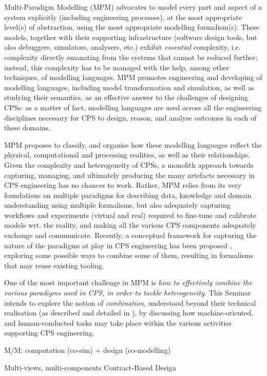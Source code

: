 Multi-Paradigm Modelling (MPM) advocates to model every part and aspect of a system
explicitly (including engineering processes), at the most appropriate level(s) 
of abstraction, using the most appropriate modelling formalism(s). These models,
together with their supporting infrastructure (software design tools, but also
debuggers, simulators, analysers, etc.) exhibit \emph{essential} complexity, i.e.
complexity directly emanating from the systems that cannot be reduced further;
instead, this complexity has to be managed with the help, among other techniques,
of modelling languages. MPM promotes engineering and developing of 
modelling languages, including model transformation and simulation, as well as
studying their semantics, as an effective answer to the challenges of designing
CPSs: as a matter of fact, modelling languages are used across all the engineering
disciplines necessary for CPS to design, reason, and analyse outcomes in each
of these domains.

MPM proposes to classify, and organise how these modelling languages reflect 
the physical, computational and processing realities, as well as their relationships.
Given the complexity and heterogeneity of CPSs, a monolith approach towards
capturing, managing, and ultimately producing the many artefacts necessary in
CPS engineering has no chances to work. Rather, MPM relies from its very foundations
on multiple paradigms for describing data, knowledge and domain understanding
using multiple formalisms, but also adequately capturing workflows and experiments
(virtual and real) required to fine-tune and calibrate models wrt. the reality,
and making all the various CPS components adequately exchange and communicate.
Recently, a conceptual framework for capturing the nature of the paradigms at 
play in CPS engineering has been proposed \cite{J:Amrani-etAl:2020}, exploring some 
possible ways to combine some of them, resulting in formalisms that may reuse
existing tooling. 

One of the most important challenge in MPM is \emph{how to effectively combine the various
paradigms used in CPS, in order to tackle heterogeneity}. This Seminar intends
to explore the notion of \emph{combination}, understood beyond their technical
realisation (as described and detailed in \cite{J:Amrani-etAl:2020}), by discussing 
how machine-oriented, and human-conducted tasks may take place within the various 
activities supporting CPS engineering. 


M/M: computation (co-sim) + design (co-modelling)

Multi-views, multi-components
Contract-Based Design

